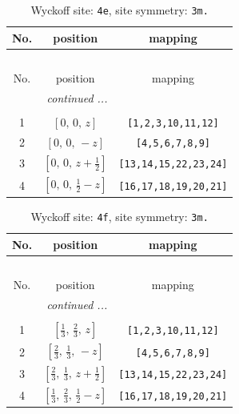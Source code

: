 \documentclass[fleqn,8pt]{jsarticle}
\begin{document}
\begin{longtable}{ccc}
\caption{Wyckoff site: {\tt 4e}, site symmetry: {\tt 3m.}}
 \\
 \hline \hline
No. & position & mapping \\ \hline \endfirsthead

\multicolumn{2}{l}{\tablename\ \thetable{}} \\
 \hline \hline
No. & position & mapping \\ \hline \endhead

 \hline \hline
\multicolumn{2}{r}{\footnotesize\it continued ...} \\ \endfoot

 \hline \hline
\multicolumn{2}{r}{} \\ \endlastfoot

1 & $\left[ 0,\, 0,\, z \right]$ & {\tt [1,2,3,10,11,12]} \\ \hline
2 & $\left[ 0,\, 0,\, - z \right]$ & {\tt [4,5,6,7,8,9]} \\ \hline
3 & $\left[ 0,\, 0,\, z + \frac{1}{2} \right]$ & {\tt [13,14,15,22,23,24]} \\ \hline
4 & $\left[ 0,\, 0,\, \frac{1}{2} - z \right]$ & {\tt [16,17,18,19,20,21]} \\
\end{longtable}
\renewcommand{\arraystretch}{1.2}
\begin{longtable}{ccc}
\caption{Wyckoff site: {\tt 4f}, site symmetry: {\tt 3m.}}
 \\
 \hline \hline
No. & position & mapping \\ \hline \endfirsthead

\multicolumn{2}{l}{\tablename\ \thetable{}} \\
 \hline \hline
No. & position & mapping \\ \hline \endhead

 \hline \hline
\multicolumn{2}{r}{\footnotesize\it continued ...} \\ \endfoot

 \hline \hline
\multicolumn{2}{r}{} \\ \endlastfoot

1 & $\left[ \frac{1}{3},\, \frac{2}{3},\, z \right]$ & {\tt [1,2,3,10,11,12]} \\ \hline
2 & $\left[ \frac{2}{3},\, \frac{1}{3},\, - z \right]$ & {\tt [4,5,6,7,8,9]} \\ \hline
3 & $\left[ \frac{2}{3},\, \frac{1}{3},\, z + \frac{1}{2} \right]$ & {\tt [13,14,15,22,23,24]} \\ \hline
4 & $\left[ \frac{1}{3},\, \frac{2}{3},\, \frac{1}{2} - z \right]$ & {\tt [16,17,18,19,20,21]} \\
\end{longtable}
\end{document}
